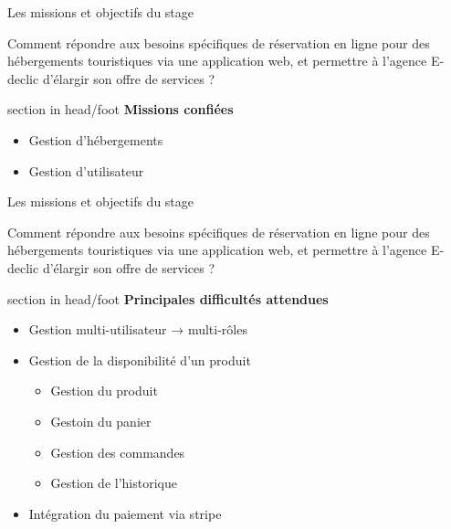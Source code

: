 \documentclass{beamer}
\begin{document}
\begin{frame}{Les missions et objectifs du stage}

	Comment répondre aux besoins spécifiques de réservation en ligne pour des hébergements touristiques via une application web, et permettre à l’agence E-declic d’élargir son offre de services ?
			
	\begin{center}
  		\begin{minipage}{0.9\textwidth}
			\begin{beamercolorbox}[wd=\paperwidth,ht=1.5em,dp=0.5em,leftskip=0.5cm]{section in head/foot}
  				\large \textbf{Missions confiées}
			\end{beamercolorbox}
			
			\begin{itemize}
				\item Gestion d'hébergements
				\item Gestion d'utilisateur
			\end{itemize}
  		\end{minipage}
	\end{center}
	\vfill
\end{frame}

\begin{frame}{Les missions et objectifs du stage}

	Comment répondre aux besoins spécifiques de réservation en ligne pour des hébergements touristiques via une application web, et permettre à l’agence E-declic d’élargir son offre de services ?
			
	\begin{center}
  		\begin{minipage}{0.9\textwidth}
			\begin{beamercolorbox}[wd=\paperwidth,ht=1.5em,dp=0.5em,leftskip=0.5cm]{section in head/foot}
  				\large \textbf{Principales difficultés attendues}
			\end{beamercolorbox}
			
			\begin{itemize}
				\item Gestion multi-utilisateur → multi-rôles
				\item Gestion de la disponibilité d'un produit
				\begin{itemize}
					\item Gestion du produit
					\item Gestoin du panier
					\item Gestion des commandes
					\item Gestion de l'historique
				\end{itemize}
				\item Intégration du paiement via stripe
			\end{itemize}
  		\end{minipage}
	\end{center}
	\vfill
\end{frame}
\end{document}
